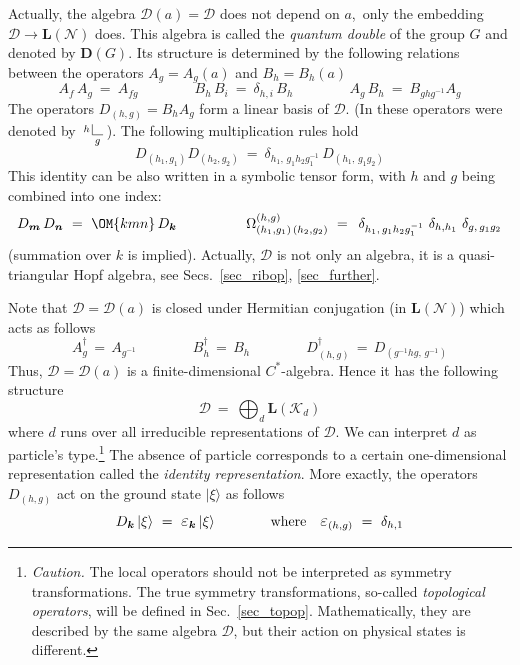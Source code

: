\documentclass[12pt]{article}
\newcommand{\LL}{\mathbf{L}}
\newcommand{\D}{\mathbf{D}}
\newcommand{\Om}{\Omega}
\newcommand{\Eps}{\mbox{\large$\varepsilon$}}
\newcommand{\del}{\delta} %
\newcommand*{\boldind}[1]{{\mbox{\scriptsize\boldmath$#1$}}}
\newcommand*{\RD}[1]{D_\boldind{#1}}
\newcommand*{\EPS}[1]{\Eps_\boldind{#1}}
\newcommand{\calD}{\mathcal{D}}
\newcommand{\calK}{\mathcal{K}}
\newcommand{\calN}{\mathcal{N}}
\begin{document}
Actually, the algebra $\calD(a)=\calD$ does not depend on $a$,\, only the
embedding $\calD\to\LL(\calN)$ does. This algebra is called the \emph{quantum
double} of the group $G$ and denoted by $\D(G)$. Its structure is determined
by the following relations between the operators $A_g=A_g(a)$ and $B_h=B_h(a)$
\begin{equation}
  A_f\,A_g \ =\  A_{fg} \qquad\qquad
  B_h\,B_i \ =\ \del_{h,i}\,B_h \qquad\qquad
  A_g\,B_h \ =\ B_{ghg^{-1}}A_g
\end{equation}
The operators $D_{(h,g)}=B_hA_g$ form a linear basis of $\calD$.  (In
\cite{DPR,BDP} these operators were denoted by\,
$\raisebox{0.5ex}{$\scriptstyle h$\,}
{\mathop{\mbox{\rule{0.4pt}{1.8ex}\rule{1.8ex}{0.4pt}}}\limits_g}$\,).  The
following multiplication rules hold
\[
   D_{(h_1,g_1)} D_{(h_2,g_2)} \ =\ 
  \del_{h_1,\,g_1h_2g_1^{-1}}\, D_{(h_1,\,g_1g_2)}
\]
This identity can be also written in a symbolic tensor form, with $h$ and $g$ 
being combined into one index:
\begin{equation} \label{locmult}
  \RD{m}\,\RD{n}\ =\ \OM{kmn}\, \RD{k}
  \qquad\qquad\quad
  \Om^{(h,g)}_{(h_1,g_1)\,(h_2,g_2)}\ =\,\ 
  \del_{h_1,\,g_1h_2g_1^{-1}}\ \del_{h,h_1}\ \del_{g,\,g_1g_2}
\end{equation}
(summation over {\boldmath$k$} is implied). Actually, $\calD$ is not only an
algebra, it is a quasi-triangular Hopf algebra, see 
Secs.~\ref{sec_ribop}, \ref{sec_further}.

Note that $\calD=\calD(a)$ is closed under Hermitian conjugation 
(in $\LL(\calN)$) which acts as follows
\begin{equation} \label{conjug}
  A_g^\dagger\,=\,A_{g^{-1}} \qquad\qquad   B_h^\dagger\,=\,B_h \qquad\qquad
  D_{(h,g)}^\dagger \,=\, D_{(g^{-1}hg,\,g^{-1})}
\end{equation}
Thus, $\calD=\calD(a)$ is a finite-dimensional $C^*$-algebra. Hence it has the
following structure
\begin{equation}
  \calD\ =\ \bigoplus_d \LL(\calK_d)
\end{equation}
where $d$ runs over all irreducible representations of $\calD$. We can 
interpret $d$ as particle's type.\footnote{
 \emph{Caution.} The local operators should not be interpreted as symmetry
 transformations. The true symmetry transformations, so-called
 \emph{topological operators}, will be defined in Sec.~\ref{sec_topop}.
 Mathematically, they are described by the same algebra $\calD$, but their
 action on physical states is different.}
The absence of particle corresponds to a certain one-dimensional
representation called the \emph{identity representation}. More exactly, the
operators $D_{(h,g)}$ act on the ground state $|\xi\rangle$ as follows
\begin{equation} \label{epsilon}
  \RD{k}\,|\xi\rangle\ =\ \EPS{k}\,|\xi\rangle \qquad\qquad
  \mbox{where}\quad \Eps_{(h,g)}\ =\ \del_{h,1}
\end{equation}
\end{document}
